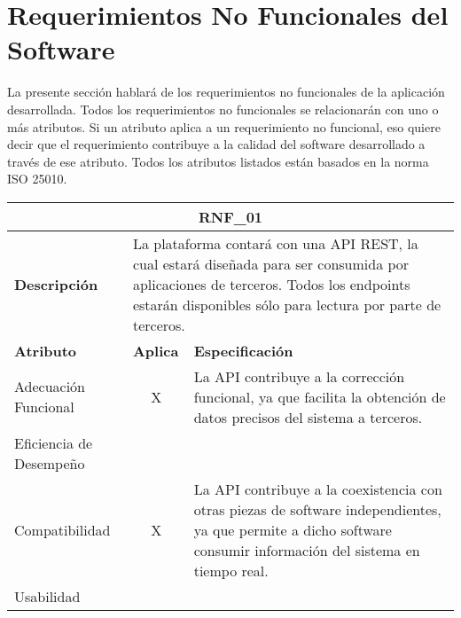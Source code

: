 \section{Requerimientos No Funcionales del Software}
La presente sección hablará de los requerimientos no funcionales de la aplicación desarrollada. Todos los requerimientos no funcionales se relacionarán con uno o más atributos. Si un atributo aplica a un requerimiento no funcional, eso quiere decir que el requerimiento contribuye a la calidad del software desarrollado a través de ese atributo. Todos los atributos listados están basados en la norma ISO 25010.

\begin{center}
  \begin{tabular}{ | p{2cm}| p{8cm} | p{5cm} |}
    \hline
    \multicolumn{3}{|c|}{\textbf{RNF\_01}} \\
    \hline
    
    \multicolumn{1}{|p{2cm}|}{\textbf{Descripción}} & \multicolumn{2}{|p{13cm}|}{La plataforma contará con una API REST, la cual estará diseñada para ser consumida por aplicaciones de terceros. Todos los endpoints estarán disponibles sólo para lectura por parte de terceros.} \\ \hline
    
    \multicolumn{1}{|p{3.5cm}|}{\textbf{{Atributo}}} & \multicolumn{1}{|p{1.5cm}|}{\textbf{Aplica}} & \multicolumn{1}{|p{10cm}|}{\textbf{Especificación}} \\ \hline
    
    \multicolumn{1}{|p{3.5cm}|}{\nohyphens{Adecuación Funcional}} & \multicolumn{1}{|c|}{X} & \multicolumn{1}{|p{10cm}|}{La API contribuye a la corrección funcional, ya que facilita la obtención de datos precisos del sistema a terceros.} \\ \hline
    
    \multicolumn{1}{|p{3.5cm}|}{\nohyphens{Eficiencia de Desempeño}} & \multicolumn{1}{|c|}{} & \multicolumn{1}{|p{10cm}|}{} \\ \hline
    
    \multicolumn{1}{|p{3.5cm}|}{\nohyphens{Compatibilidad}} & \multicolumn{1}{|c|}{X} & \multicolumn{1}{|p{10cm}|}{La API contribuye a la coexistencia con otras piezas de software independientes, ya que permite a dicho software consumir información del sistema en tiempo real.} \\ \hline
    
    \multicolumn{1}{|p{3.5cm}|}{\nohyphens{Usabilidad}} & \multicolumn{1}{|c|}{} & \multicolumn{1}{|p{10cm}|}{} \\ \hline
    

\end{tabular}
\end{center}

